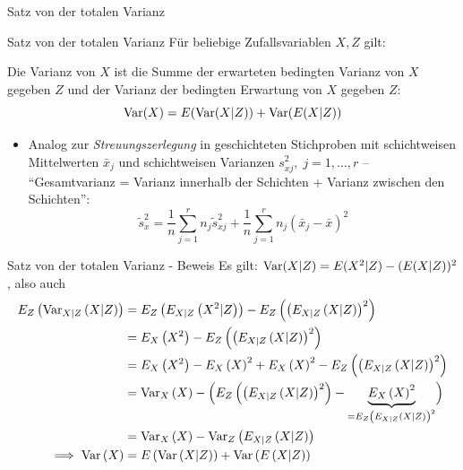 \documentclass[
  10pt,
  ignorenonframetext,
]{beamer}
\providecommand{\tightlist}{%
  \setlength{\itemsep}{0pt}\setlength{\parskip}{0pt}}
\begin{document}
\begin{frame}{Satz von der totalen Varianz}
\label{satz-von-der-totalen-varianz}
\begin{block}{Satz von der totalen Varianz}
\label{satz-von-der-totalen-varianz-1}
Für beliebige Zufallsvariablen \(X, Z\) gilt:

Die Varianz von \(X\) ist die Summe der erwarteten bedingten Varianz von
\(X\) gegeben \(Z\) und der Varianz der bedingten Erwartung von \(X\)
gegeben \(Z\): \[\operatorname{Var}(X) = E(\operatorname{Var}(X|Z)) + \operatorname{Var}(E(X|Z))\]
\end{block}

\begin{itemize}
\tightlist
\item
  Analog zur \emph{Streuungszerlegung} in geschichteten Stichproben mit
  schichtweisen Mittelwerten \(\bar x_j\) und schichtweisen Varianzen
  \(s_{xj}^2, \; j=1,\dots,r\) --\\
  ``Gesamtvarianz = Varianz innerhalb der Schichten + Varianz zwischen
  den Schichten'':
  \[\widetilde s_x^2 = \frac{1}{n} \sum_{j=1}^r n_j \widetilde s_{xj}^2 + \frac{1}{n} \sum_{j=1}^r n_j(\bar x_j - \bar x)^2\]
\end{itemize}
\end{frame}

\begin{frame}{Satz von der totalen Varianz - Beweis}
\label{satz-von-der-totalen-varianz---beweis}
Es gilt: \(\operatorname{Var}(X|Z) = E(X^2|Z) - (E(X|Z))^2\), also auch \begin{align*}
E_Z\left(\operatorname{Var}_{X|Z}\left(X|Z\right)\right) &= E_Z\left(E_{X|Z}\left(X^2|Z\right)\right) - E_Z\left(\left(E_{X|Z}\left(X|Z\right)\right)^2\right) \\ 
  &= E_X\left(X^2\right) - E_Z\left(\left(E_{X|Z}\left(X|Z\right)\right)^2\right) \\
  &=  E_X\left(X^2\right) - E_X\left(X\right)^2 + E_X\left(X\right)^2 - E_Z\left(\left(E_{X|Z}\left(X|Z\right)\right)^2\right) \\
  &= \operatorname{Var}_X\left(X\right) - \Bigl(E_Z\left(\left(E_{X|Z}\left(X|Z\right)\right)^2\right) - \underbrace{E_X\left(X\right)^2}_{= E_Z\left(E_{X|Z}\left(X|Z\right)\right)^2}\Bigr) \\
  &= \operatorname{Var}_X\left(X\right) - \operatorname{Var}_Z\left(E_{X|Z}\left(X|Z\right)\right) \\
\implies \operatorname{Var}\left(X\right) &= E\left(\operatorname{Var}\left(X|Z\right)\right) + \operatorname{Var}\left(E\left(X|Z\right)\right)
\end{align*}
\end{frame}
\end{document}
